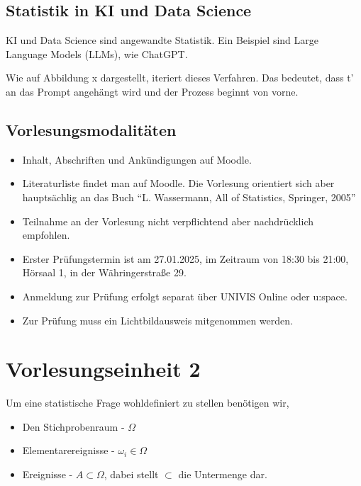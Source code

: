 \documentclass[12pt, a4paper]{article}
\begin{document}
\newpage

    \subsection{Statistik in KI und Data Science}
        KI und Data Science sind angewandte Statistik. Ein Beispiel sind Large Language Models (LLMs),
        wie ChatGPT.

        Wie auf Abbildung x dargestellt, iteriert dieses Verfahren. Das bedeutet, dass t' an das Prompt
        angehängt wird und der Prozess beginnt von vorne.

    \subsection{Vorlesungsmodalitäten}
        \begin{itemize}
            \item Inhalt, Abschriften und Ankündigungen auf Moodle.
            \item Literaturliste findet man auf Moodle. Die Vorlesung orientiert sich aber hauptsächlig an das Buch ``L. Wassermann, All of Statistics, Springer, 2005''
            \item Teilnahme an der Vorlesung nicht verpflichtend aber nachdrücklich empfohlen.
            \item Erster Prüfungstermin ist am 27.01.2025, im Zeitraum von 18:30 bis 21:00, Hörsaal 1, in der Währingerstraße 29.
            \item Anmeldung zur Prüfung erfolgt separat über UNIVIS Online oder u:space.
            \item Zur Prüfung muss ein Lichtbildausweis mitgenommen werden.
        \end{itemize}

\newpage

\section{Vorlesungseinheit 2}
        Um eine statistische Frage wohldefiniert zu stellen benötigen wir,
        \begin{itemize}
            \item Den Stichprobenraum - $\Omega$
            \item Elementarereignisse - $\omega_i \in \Omega$
            \item Ereignisse - $A \subset \Omega$, dabei stellt $\subset$ die Untermenge dar.
        \end{itemize}
\end{document}
